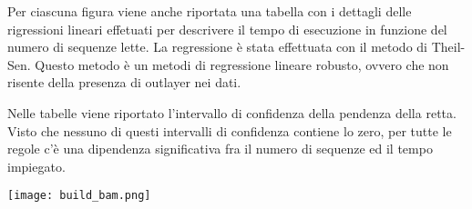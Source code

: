 Per ciascuna figura viene anche riportata una tabella con i dettagli delle rigressioni lineari effetuati per descrivere il tempo di esecuzione in funzione del numero di sequenze lette.
La regressione è stata effettuata con il metodo di Theil-Sen.
Questo metodo è un metodi di regressione lineare robusto, ovvero che non risente della presenza di outlayer nei dati.

Nelle tabelle viene riportato l'intervallo di confidenza della pendenza della retta.
Visto che nessuno di questi intervalli di confidenza contiene lo zero, per tutte le regole c'è una dipendenza significativa fra il numero di sequenze ed il tempo impiegato.

\begin{table}[H]
  \begin{minipage}[b]{0.4\linewidth}
	\centering
	\texttt{[image: build\_bam.png]}
	\label{subfig:BB}
  \end{minipage}
  \hfill 
  \begin{varwidth}[b]{0.4\linewidth}
    \centering
    \caption{Dettagli retta di fit per Build BAM.}
    \label{tab:Bb}
  \end{varwidth}%
\end{table}

